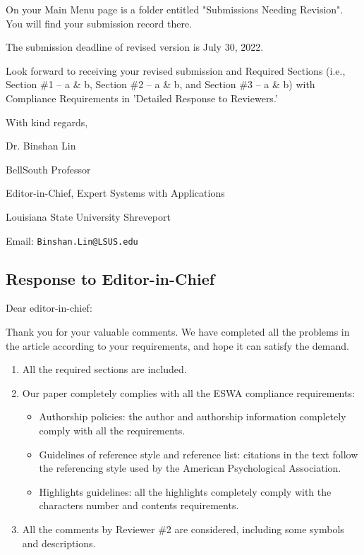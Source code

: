 \documentclass[12pt, review]{elsarticle}
\begin{document}
On your Main Menu page is a folder entitled "Submissions Needing Revision". You will find your submission record there.

The submission deadline of revised version is July 30, 2022.

Look forward to receiving your revised submission and Required Sections (i.e., Section \#1 – a \& b, Section \#2 – a \& b, and Section \#3 – a \& b) with Compliance Requirements in 'Detailed Response to Reviewers.'

\noindent With kind regards,

\noindent Dr. Binshan Lin 

\noindent BellSouth Professor 

\noindent Editor-in-Chief, Expert Systems with Applications  

\noindent Louisiana State University Shreveport 

\noindent Email: \verb|Binshan.Lin@LSUS.edu| 


\subsection{Response to Editor-in-Chief}
\noindent Dear editor-in-chief: 

Thank you for your valuable comments. We have completed all the
problems in the article according to your requirements, and hope it can satisfy the demand.

\begin{enumerate}
  \item All the required sections are included.
  \item Our paper completely complies with all the ESWA compliance requirements:
  \begin{itemize}
    \item Authorship policies: the author and authorship information completely comply with all the requirements.
    \item Guidelines of reference style and reference list: citations in the text follow the referencing style used by the American Psychological Association.
    \item Highlights guidelines: all the highlights completely comply with the characters  number and contents requirements.
  \end{itemize}
  \item All the comments by Reviewer \#2 are considered, including some symbols and descriptions.
\end{enumerate}
\end{document}
